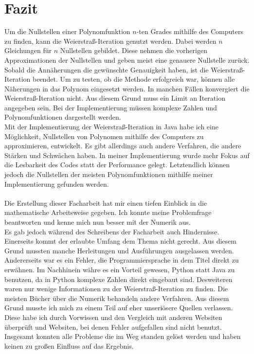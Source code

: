 \documentclass[12pt]{article}
\begin{document}
\section{Fazit}
Um die Nullstellen einer Polynomfunktion $n$-ten Grades mithilfe des Computers zu finden, kann die Weierstraß-Iteration genutzt werden. Dabei werden $n$ Gleichungen für $n$ Nullstellen gebildet. Diese nehmen die vorherigen Approximationen der Nullstellen und geben meist eine genauere Nullstelle zurück. Sobald die Annäherungen die gewünschte Genauigkeit haben, ist die Weierstraß-Iteration beendet. Um zu testen, ob die Methode erfolgreich war, können alle Näherungen in das Polynom eingesetzt werden. In manchen Fällen konvergiert die Weierstraß-Iteration nicht. Aus diesem Grund muss ein Limit an Iteration angegeben sein. Bei der Implementierung müssen komplexe Zahlen und Polynomfunktionen dargestellt werden. %
\\
Mit der Implementierung der Weierstraß-Iteration in Java habe ich eine Möglichkeit, Nullstellen von Polynomen mithilfe des Computers zu approximieren, entwickelt. Es gibt allerdings auch andere Verfahren, die andere Stärken und Schwächen haben. In meiner Implementierung wurde mehr Fokus auf die Lesbarkeit des Codes statt der Performance gelegt. Letztendlich können jedoch die Nullstellen der meisten Polynomfunktionen mithilfe meiner Implementierung gefunden werden.\\ %
\\
Die Erstellung dieser Facharbeit hat mir einen tiefen Einblick in die mathematische Arbeitsweise gegeben. Ich konnte meine Problemfrage beantworten und kenne mich nun besser mit der Numerik aus.\\
Es gab jedoch während des Schreibens der Facharbeit auch Hindernisse. Einerseits kommt der erlaubte Umfang dem Thema nicht gerecht. Aus diesem Grund mussten manche Herleitungen und Ausführungen ausgelassen werden. Andererseits war es ein Fehler, die Programmiersprache in dem Titel direkt zu erwähnen. Im Nachhinein währe es ein Vorteil gewesen, Python statt Java zu benutzen, da in Python komplexe Zahlen direkt eingebaut sind. Desweiteren waren nur wenige Informationen zu der Weierstraß-Iteration zu finden. Die meisten Bücher über die Numerik behandeln andere Verfahren. Aus diesem Grund musste ich mich zu einem Teil auf eher unseriösere Quellen verlassen. Diese habe ich durch Vorwissen und den Vergleich mit anderen Websiten überprüft und Websiten, bei denen Fehler aufgefallen sind nicht benutzt. Insgesamt konnten alle Probleme die im Weg standen gelöst werden und haben keinen zu großen Einfluss auf das Ergebnis. %
\end{document}
